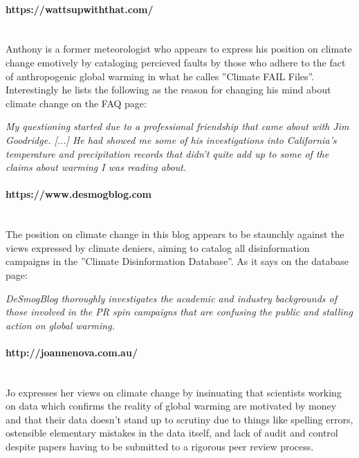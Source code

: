 \documentclass[11pt]{article}
\begin{document}
\paragraph{https://wattsupwiththat.com/} \hspace{0pt} \\
Anthony is a former meteorologist who appears to express his position on climate
change emotively by cataloging percieved faults by those who adhere to the fact of
anthropogenic global warming in what he calles ''Climate FAIL Files''. Interestingly
he lists the following as the reason for changing his mind about climate change on
the FAQ page:

\begin{displayquote}
\textit{My questioning started due to a professional friendship that came
about with Jim Goodridge. [...] He had showed me some of his investigations into
California’s temperature and precipitation records that didn’t quite add up to some
of the claims about warming I was reading about.}
\end{displayquote}

\paragraph{https://www.desmogblog.com} \hspace{0pt} \\
The position on climate change in this blog appears to be staunchly against
the views expressed by climate deniers, aiming to catalog all disinformation
campaigns in the ''Climate Disinformation Database''. As it says on the
database page:

\begin{displayquote}
\textit{DeSmogBlog thoroughly investigates the academic and industry backgrounds of those
involved in the PR spin campaigns that are confusing the public and stalling action
on global warming.}
\end{displayquote}

\paragraph{http://joannenova.com.au/} \hspace{0pt} \\
Jo expresses her views on climate change by insinuating that scientists working on
data which confirms the reality of global warming are motivated by money and that
their data doesn't stand up to scrutiny due to things like spelling errors,
ostensible elementary mistakes in the data itself, and lack of audit and control
despite papers having to be submitted to a rigorous peer review process.
\end{document}
